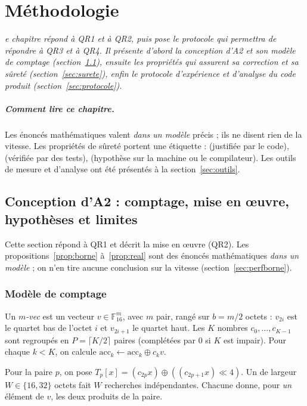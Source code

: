 \let\textcircled=\pgftextcircled
\chapter{Méthodologie}
\label{ch:methodo}

\minitoc
\bigskip

\textit{e chapitre répond à QR1 et à QR2, puis pose le protocole qui permettra de répondre à QR3 et à QR4. Il présente d'abord la conception d'A2 et son modèle de comptage (section~\ref{sec:a2}), ensuite les propriétés qui assurent sa correction et sa sûreté (section~\ref{sec:surete}), enfin le protocole d'expérience et d'analyse du code produit (section~\ref{sec:protocole}).}

\newpage

\paragraph{Comment lire ce chapitre.} Les énoncés mathématiques valent \emph{dans un modèle} précis ; ils ne disent rien de la vitesse. Les propriétés de sûreté portent une étiquette : \Pc{} (justifiée par le code), \Pe{} (vérifiée par des tests), \Hy{} (hypothèse sur la machine ou le compilateur). Les outils de mesure et d'analyse ont été présentés à la section~\ref{sec:outils}.


\section{Conception d'A2 : comptage, mise en œuvre, hypothèses et limites}\label{sec:a2}
Cette section répond à QR1 et décrit la mise en œuvre (QR2). Les propositions~\ref{prop:borne} à~\ref{prop:real} sont des énoncés mathématiques \emph{dans un modèle} ; on n'en tire aucune conclusion sur la vitesse (section~\ref{sec:perfborne}).

\subsection{Modèle de comptage}
\begin{definition}[Données]
Un \emph{$m$-vec} est un vecteur $v\in\mathbb{F}_{16}^m$, avec $m$ pair, rangé sur $b=m/2$ octets : $v_{2i}$ est le quartet bas de l'octet $i$ et $v_{2i+1}$ le quartet haut. Les $K$ nombres $c_0,\dots,c_{K-1}$ sont regroupés en $P=\lceil K/2\rceil$ paires (complétées par 0 si $K$ est impair). Pour chaque $k<K$, on calcule $\mathrm{acc}_k\leftarrow\mathrm{acc}_k\oplus c_k v$.
\end{definition}
Pour la paire $p$, on pose $T_p[x]=(c_{2p}x)\oplus((c_{2p+1}x)\ll4)$. Un \vpshufb{} de largeur $W\in\{16,32\}$ octets fait $W$ recherches indépendantes. Chacune donne, pour \emph{un} élément de $v$, les deux produits de la paire.

